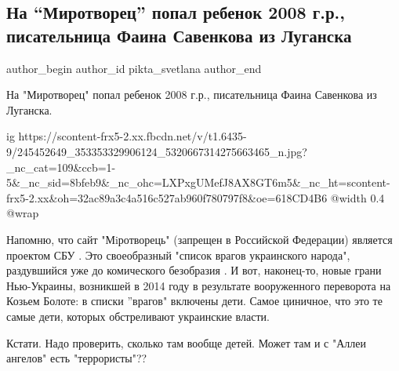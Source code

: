  
 
 
 
 
 
\subsection{На \enquote{Миротворец} попал ребенок 2008 г.р., писательница Фаина Савенкова из Луганска}
\label{sec:13_10_2021.fb.pikta_svetlana.1.mirotvorec_savenkova}
 
\ifcmt
 author_begin
   author_id pikta_svetlana
 author_end
\fi

На "Миротворец" попал ребенок 2008 г.р., писательница Фаина Савенкова из
Луганска.

\ifcmt
  ig https://scontent-frx5-2.xx.fbcdn.net/v/t1.6435-9/245452649_353353329906124_5320667314275663465_n.jpg?_nc_cat=109&ccb=1-5&_nc_sid=8bfeb9&_nc_ohc=LXPxgUMefJ8AX8GT6m5&_nc_ht=scontent-frx5-2.xx&oh=32ac89a3c4a516c527ab960f780797f8&oe=618CD4B6
  @width 0.4
  @wrap 
\fi

Напомню, что сайт "Мiротворець" (запрещен в Российской Федерации) является
проектом СБУ . Это своеобразный "список врагов украинского народа", раздувшийся
уже до комического безобразия . И вот, наконец-то, новые грани Нью-Украины,
возникшей в 2014 году в результате вооруженного переворота на  Козьем Болоте: в
списки ''врагов" включены дети. Самое циничное, что это те самые дети, которых
обстреливают украинские власти. 

Кстати. Надо проверить, сколько там вообще детей. Может там и с "Аллеи ангелов"
есть "террористы"??

